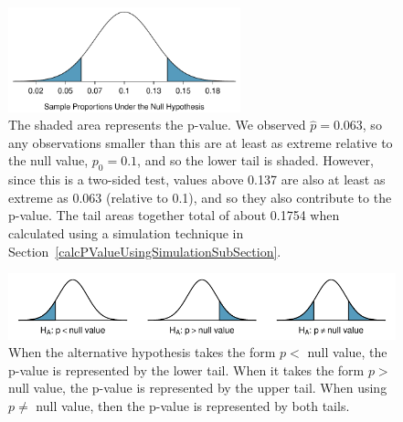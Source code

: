 \begin{figure}[ht]
\centering
\includegraphics[width=0.6\textwidth]{ch_foundations_for_inf/figures/MedicalConsultant/MedConsNullNormal}
\caption{The shaded area represents the p-value. We observed $\hat{p} = 0.063$, so any observations smaller than this are at least as extreme relative to the null value, $p_0 = 0.1$, and so the lower tail is shaded. However, since this is a two-sided test, values above 0.137 are also at least as extreme as 0.063 (relative to 0.1), and so they also contribute to the p-value. The tail areas together total of about 0.1754 when calculated using a simulation technique in Section~\ref{calcPValueUsingSimulationSubSection}.}
\label{MedConsNullNormal}
\end{figure}

\begin{figure}[ht]
\centering
\includegraphics[width=\textwidth]{ch_foundations_for_inf/figures/sidedness/sidedness_example_figures}
\caption{When the alternative hypothesis takes the form $p <$ null value, the p-value is represented by the lower tail. When it takes the form $p >$ null value, the p-value is represented by the upper tail. When using $p \neq$ null value, then the p-value is represented by both tails.}
\label{sidedness_example_figures}
\end{figure}


